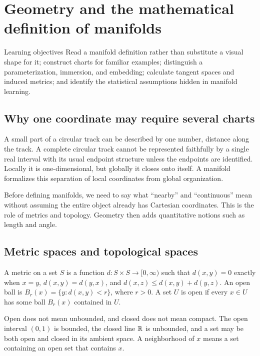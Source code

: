 \chapter{Geometry and the mathematical definition of manifolds}\label{ch:03}
\begin{insight}{Learning objectives}
Read a manifold definition rather than substitute a visual shape for it; construct charts for familiar examples; distinguish a parameterization, immersion, and embedding; calculate tangent spaces and induced metrics; and identify the statistical assumptions hidden in manifold learning.
\end{insight}

\section{Why one coordinate may require several charts}
A small part of a circular track can be described by one number, distance along the track. A complete circular track cannot be represented faithfully by a single real interval with its usual endpoint structure unless the endpoints are identified. Locally it is one-dimensional, but globally it closes onto itself. A manifold formalizes this separation of local coordinates from global organization.

Before defining manifolds, we need to say what ``nearby'' and ``continuous'' mean without assuming the entire object already has Cartesian coordinates. This is the role of metrics and topology. Geometry then adds quantitative notions such as length and angle.

\section{Metric spaces and topological spaces}
\begin{definition}[Metric]
A metric on a set $S$ is a function $d:S\times S\to[0,\infty)$ such that $d(x,y)=0$ exactly when $x=y$, $d(x,y)=d(y,x)$, and $d(x,z)\leq d(x,y)+d(y,z)$. An open ball is $B_r(x)=\{y:d(x,y)<r\}$, where $r>0$. A set $U$ is open if every $x\in U$ has some ball $B_r(x)$ contained in $U$.
\end{definition}
Open does not mean unbounded, and closed does not mean compact. The open interval $(0,1)$ is bounded, the closed line $\mathbb{R}$ is unbounded, and a set may be both open and closed in its ambient space. A neighborhood of $x$ means a set containing an open set that contains $x$.

